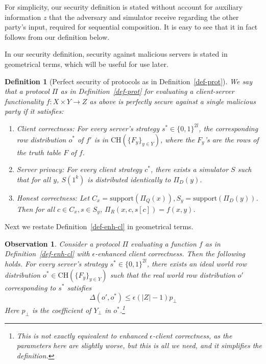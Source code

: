 \documentclass[a4paper]{article}
\newtheorem{definition}{Definition}[section]
\newtheorem{observation}{Observation}
\newcommand{\support}{\mathrm{support}}
\newcommand{\CH}[1]{\text{CH}(#1)}
\begin{document}
For simplicity, our security definition is stated without account for auxiliary information $z$ that the adversary and simulator receive regarding the other party's input, required for sequential composition. It is easy to see that it in fact follows from our definition below. 

In our security definition, security against malicious servers is stated in geometrical terms, which will be useful for use later.

\begin{definition}[Perfect security of protocols as in Definition~\ref{def-prot}]\label{perfect-security}
We say that a protocol $\Pi$ as in Definition~\ref{def-prot} for evaluating a client-server functionality $f:X\times Y\rightarrow Z$ as above is perfectly secure against a single malicious party if it satisfies:
\begin{enumerate}
\item Client correctness: For every server's strategy $s^*\in \{0,1\}^{2l}$, the corresponding row distribution $o^*$ of $f'$
is in $\CH{\{F_y\}_{y\in Y}}$, where the $F_y$'s are the rows of the truth table $F$ of $f$.
\item Server privacy: For every client strategy $c^*$, there exists a simulator $S$ such that for all $y$,
$S(1^k)$ is distributed identically to $\Pi_D(y)$. 

\item Honest correctness: Let $C_x=\support(\Pi_Q(x)),S_y=\support(\Pi_D(y))$. Then for all $c\in C_x,s\in S_y$, $\Pi_R(x,c,s[c])=f(x,y)$.
\end{enumerate}
\end{definition}

Next we restate Definition~\ref{def-enh-cl} in geometrical terms.

\begin{observation}\label{obs-geom-enh-cl}
	Consider a protocol $\Pi$ evaluating a function $f$ as in Definition~\ref{def-enh-cl} with $\epsilon$-enhanced client correctness.
	Then the following holds. 
	For every server's strategy $s^*\in \{0,1\}^{2l}$, 
	there exists an ideal world row distribution $o^*\in \CH{\{F_y\}_{y\in Y}}$ such that 
	the real world row distribution $o'$ corresponding to $s^*$
	satisfies 
	\[\Delta(o',o^*)\leq \epsilon(|Z|-1)p_\bot\]
	Here $p_\bot$ is the coefficient of $Y_\bot$ in $o^*$.\footnote{This is not exactly equivalent to enhanced $\epsilon$-client correctness, as the parameters here are slightly worse, but this is all we need, and it simplifies the definition.}
\end{observation} 
\end{document}
